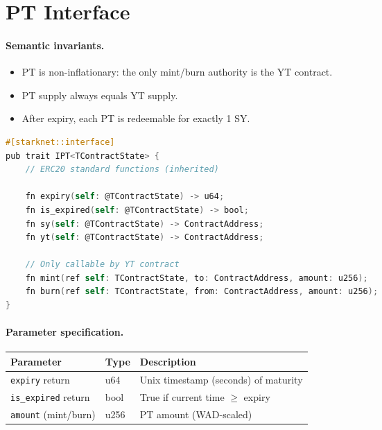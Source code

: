 \section{PT Interface}

\paragraph{Semantic invariants.}
\begin{itemize}
\item PT is non-inflationary: the only mint/burn authority is the YT contract.
\item PT supply always equals YT supply.
\item After expiry, each PT is redeemable for exactly 1 SY.
\end{itemize}

\begin{lstlisting}[language=C,basicstyle=\ttfamily\small,frame=single,breaklines=true,columns=fullflexible]
#[starknet::interface]
pub trait IPT<TContractState> {
    // ERC20 standard functions (inherited)

    fn expiry(self: @TContractState) -> u64;
    fn is_expired(self: @TContractState) -> bool;
    fn sy(self: @TContractState) -> ContractAddress;
    fn yt(self: @TContractState) -> ContractAddress;

    // Only callable by YT contract
    fn mint(ref self: TContractState, to: ContractAddress, amount: u256);
    fn burn(ref self: TContractState, from: ContractAddress, amount: u256);
}
\end{lstlisting}

\paragraph{Parameter specification.}
\begin{center}
\begin{tabular}{l l l}
\toprule
\textbf{Parameter} & \textbf{Type} & \textbf{Description} \\
\midrule
\texttt{expiry} return & u64 & Unix timestamp (seconds) of maturity \\
\texttt{is\_expired} return & bool & True if current time $\geq$ expiry \\
\texttt{amount} (mint/burn) & u256 & PT amount (WAD-scaled) \\
\bottomrule
\end{tabular}
\end{center}

